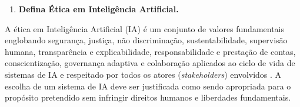 \begin{enumerate}\bfseries
    \item \textbf{Defina Ética em Inteligência Artificial. }
\end{enumerate}


A ética em Inteligência Artificial (IA) é um conjunto de valores fundamentais  englobando segurança, justiça, não discriminação, sustentabilidade, supervisão humana, transparência e explicabilidade, responsabilidade e prestação de contas, conscientização, governança adaptiva e colaboração aplicados ao ciclo de vida de sistemas de IA e respeitado por todos os atores (\textit{stakeholders}) envolvidos \cite{unesco_ethics_ai}. A escolha de um sistema de IA deve ser justificada como sendo apropriada para o propósito pretendido sem infringir direitos humanos e liberdades fundamentais. 





